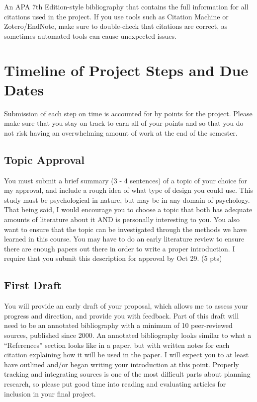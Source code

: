 \documentclass[
  12pt,
  letterpaper,
]{scrartcl}
\begin{document}
An APA 7th Edition-style bibliography that contains the full information
for all citations used in the project. If you use tools such as Citation
Machine or Zotero/EndNote, make sure to double-check that citations are
correct, as sometimes automated tools can cause unexpected issues.

\section{Timeline of Project Steps and Due
Dates}\label{timeline-of-project-steps-and-due-dates}

Submission of each step on time is accounted for by points for the
project. Please make sure that you stay on track to earn all of your
points and so that you do not risk having an overwhelming amount of work
at the end of the semester.

\subsection{Topic Approval}\label{topic-approval}

You must submit a brief summary (3 - 4 sentences) of a topic of your
choice for my approval, and include a rough idea of what type of design
you could use. This study must be psychological in nature, but may be in
any domain of psychology. That being said, I would encourage you to
choose a topic that both has adequate amounts of literature about it AND
is personally interesting to you. You also want to ensure that the topic
can be investigated through the methods we have learned in this course.
You may have to do an early literature review to ensure there are enough
papers out there in order to write a proper introduction. I require that
you submit this description for approval by Oct 29. (5 pts)

\subsection{First Draft}\label{first-draft}

You will provide an early draft of your proposal, which allows me to
assess your progress and direction, and provide you with feedback. Part
of this draft will need to be an annotated bibliography with a minimum
of 10 peer-reviewed sources, published since 2000. An annotated
bibliography looks similar to what a ``References'' section looks like
in a paper, but with written notes for each citation explaining how it
will be used in the paper. I will expect you to at least have outlined
and/or began writing your introduction at this point. Properly tracking
and integrating sources is one of the most difficult parts about
planning research, so please put good time into reading and evaluating
articles for inclusion in your final project.
\end{document}

